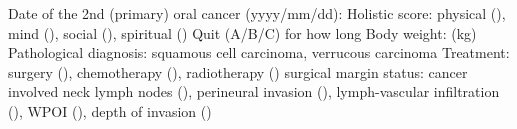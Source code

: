 \documentclass{article}
\begin{document}
\begin{outline}
\1 Date of the 2nd (primary) oral cancer (yyyy/mm/dd):
    \2 Holistic score: physical (), mind (), social (), spiritual ()
    \2 Quit (A/B/C) for how long
    \2 Body weight: (kg)
    \2 Pathological diagnosis: squamous cell carcinoma, verrucous carcinoma 
    \2 Treatment: surgery (), chemotherapy (), radiotherapy ()
    \2 surgical margin status:
    \2 cancer involved neck lymph nodes (), perineural invasion (), lymph-vascular infiltration (), WPOI (), depth of invasion ()
\end{outline}

                        
\end{document}
